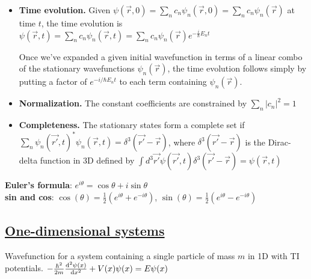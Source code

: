 \begin{itemize}[noitemsep,wide=0pt, leftmargin=\dimexpr{} + 2\relax]
    \item \textbf{Time evolution.}
        Given $\psi(\vec{r}, 0) = \sum_n c_n \psi_n(\vec{r}, 0) = \sum_n c_n \psi_n (\vec{r})$
        at time $t$, the time evolution is 
        $\psi(\vec{r}, t) = \sum_n c_n \psi_n(\vec{r}, t) = \sum_n c_n \psi_n(\vec{r}) e^{-\frac{i}{\hbar} E_n t}$

        Once we've expanded a given initial wavefunction in terms of a linear combo of the stationary wavefunctions $\psi_n(\vec{r})$, the time evolution follows simply by putting a factor of $e^{-i/\hbar E_n t}$ to each term containing $\psi_n(\vec{r})$.

    \item \textbf{Normalization.}
        The constant coefficients are constrained by $\sum_n |c_n|^2 = 1$

    \item \textbf{Completeness.}
        The stationary states form a complete set if $\sum_n \psi_n (\vec{r'}, t)^* \psi_{n} (\vec{r}, t) = \delta^3 (\vec{r'} - \vec{r})$, where $\delta^3(\vec{r'} - \vec{r})$ is the Dirac-delta function in 3D defined by $\int d^3 \vec{r'} \psi(\vec{r'}, t) \delta^3(\vec{r'} - \vec{r}) = \psi(\vec{r}, t)$
\end{itemize}

\vspace{-10pt}

\textbf{Euler's formula}: $e^{i \theta} = \cos \theta + i \sin \theta$ \\
\textbf{sin and cos}: $\cos(\theta) = \frac{1}{2}(e^{i \theta} + e^{-i \theta})$, $\sin(\theta) = \frac{1}{2}(e^{i \theta} - e^{-i \theta})$ \\



\subsection{\underline{One-dimensional systems}}
Wavefunction for a system containing a single particle of mass $m$ in 1D with TI potentials.
    $- \frac{\hbar^2}{2m} \dv[2]{\psi(x)}{x} + V(x) \psi(x) = E \psi(x)$

